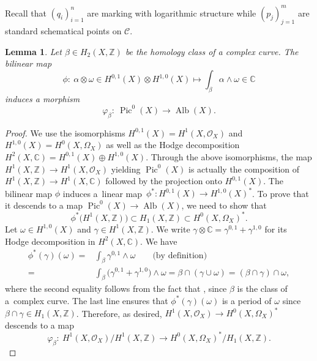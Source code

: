 \documentclass[pdftex]{sigma}
\newcommand{\Pic}{\operatorname{Pic}}
\newcommand{\Alb}{\operatorname{Alb}}
\newcommand{\ZZ}{\mathbb{Z}}
\newcommand{\CC}{\mathbb{C}}
\newcommand{\C}{\mathcal{C}}
\renewcommand{\O}{\mathcal{O}}
\numberwithin{equation}{section}
\newtheorem{lem}[theo]{Lemma}
\theoremstyle{definition}
\begin{document}
Recall that $(q_i)_{i=1}^n$ are marking with logarithmic structure while $(p_j)_{j=1}^m$ are standard schematical points on $\C$.

\begin{lem}\label{lem:mapphibeta}
Let $\beta\in H_2(X,\ZZ)$ be the homology class of a complex curve. The bilinear map
\[ \phi \colon\ \alpha\otimes\omega\in H^{0,1}(X)\otimes H^{1,0}(X)\longmapsto \int_\beta \alpha\wedge \omega\in\CC \]
induces a morphism
\[ \varphi_\beta \colon\ \Pic^0(X)\longrightarrow \Alb(X). \]
\end{lem}
\begin{proof}
We use the isomorphisms $H^{0,1}(X)=H^1(X,\O_X)$ and $H^{1,0}(X)=H^0(X,\Omega_X)$ as well as the Hodge decomposition $H^2(X,\CC)=H^{0,1}(X)\oplus H^{1,0}(X)$. Through the above isomorphisms, the map $H^1(X,\ZZ)\to H^1(X,\O_X)$ yielding $\Pic^0(X)$ is actually the composition of $H^1(X,\ZZ)\to H^1(X,\CC)$ followed by the projection onto $H^{0,1}(X)$.
The bilinear map $\phi$ induces a~linear map~${\phi^*\colon H^{0,1}(X)\to H^{1,0}(X)^*}$. To prove that it descends to a map $\Pic^0(X)\to\Alb(X)$, we need to show that
\[ \phi^*\bigl(H^1(X,\ZZ)\bigr)\subset H_1(X,\ZZ)\subset H^0(X,\Omega_X)^*. \]
Let $\omega\in H^{1,0}(X)$ and $\gamma\in H^1(X,\ZZ)$. We write $\gamma\otimes\CC=\gamma^{0,1}+\gamma^{1,0}$ for its Hodge decomposition in $H^2(X,\CC)$. We have
\begin{align*}
\phi^*(\gamma)(\omega) = {}& \int_\beta \gamma^{0,1}\wedge\omega \qquad\text{(by definition)}\\
={} & \int_\beta \bigl(\gamma^{0,1}+\gamma^{1,0}\bigr)\wedge\omega
= \beta\cap (\gamma\cup\omega)
= (\beta\cap\gamma)\cap\omega,
\end{align*}
where the second equality follows from the fact that , since $\beta$ is the class of a~complex curve. The last line ensures that $\phi^*(\gamma)(\omega)$ is a period of $\omega$ since $\beta\cap\gamma\in H_1(X,\ZZ)$. Therefore, as desired, $H^1(X,\O_X)\to H^0(X,\Omega_X)^*$ descends to a map
\[ \varphi_\beta \colon\ H^1(X,\O_X)/H^1(X,\ZZ)\longrightarrow H^0(X,\Omega_X)^*/H_1(X,\ZZ). \tag*{\qed}
\]\renewcommand{\qed}{}
\end{proof}
\end{document}
